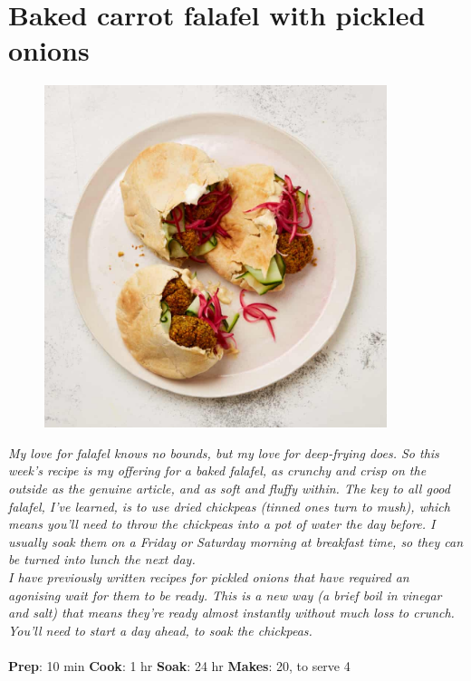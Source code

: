 \documentclass{book}
\begin{document}
\section{Baked carrot falafel with pickled onions}
\begin{figure}
\centering\includegraphics[width=10cm,height=10cm,keepaspectratio]{Recipe_Pictures/Baked_carrot_falafel_with_pickled_onions.png}
\end{figure}
\emph{My love for falafel knows no bounds, but my love for deep-frying does. So this week’s recipe is my offering for a baked falafel, as crunchy and crisp on the outside as the genuine article, and as soft and fluffy within. The key to all good falafel, I’ve learned, is to use dried chickpeas (tinned ones turn to mush), which means you’ll need to throw the chickpeas into a pot of water the day before. I usually soak them on a Friday or Saturday morning at breakfast time, so they can be turned into lunch the next day.\\ 
I have previously written recipes for pickled onions that have required an agonising wait for them to be ready. This is a new way (a brief boil in vinegar and salt) that means they’re ready almost instantly without much loss to crunch. You’ll need to start a day ahead, to soak the chickpeas.}\\\\ 
\textbf{Prep}: 10 min
\textbf{Cook}: 1 hr
\textbf{Soak}: 24 hr
\textbf{Makes}: 20, to serve 4
\end{document}
